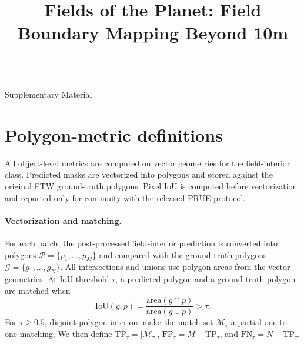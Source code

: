 \documentclass[10pt,twocolumn,letterpaper]{article}
\begin{document}
\title{Fields of the Planet: Field Boundary Mapping Beyond 10m}

\onecolumn
\begin{center}
\Large
\textbf{\thetitle}\\
\vspace{0.5em}Supplementary Material \\
\vspace{1.0em}
\end{center}
\appendix
\setcounter{table}{3}

\section{Polygon-metric definitions}
\label{app:metrics}

All object-level metrics are computed on vector geometries for the field-interior class. Predicted masks are vectorized into polygons and scored against the original FTW ground-truth polygons. Pixel IoU is computed before vectorization and reported only for continuity with the released PRUE protocol.

\paragraph{Vectorization and matching.}
For each patch, the post-processed field-interior prediction is converted into polygons $\mathcal{P}=\{p_1,\ldots,p_M\}$ and compared with the ground-truth polygons $\mathcal{G}=\{g_1,\ldots,g_N\}$. All intersections and unions use polygon areas from the vector geometries. At IoU threshold $\tau$, a predicted polygon and a ground-truth polygon are matched when
\begin{equation}
\mathrm{IoU}(g,p)=
\frac{\mathrm{area}(g\cap p)}
{\mathrm{area}(g\cup p)}
>\tau .
\end{equation}
For $\tau\ge0.5$, disjoint polygon interiors make the match set $\mathcal{M}_\tau$ a partial one-to-one matching. We then define $\mathrm{TP}_\tau=|\mathcal{M}_\tau|$, $\mathrm{FP}_\tau=M-\mathrm{TP}_\tau$, and $\mathrm{FN}_\tau=N-\mathrm{TP}_\tau$.
\end{document}
